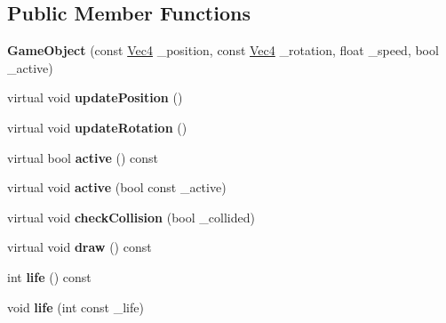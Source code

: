 \subsection*{Public Member Functions}
\begin{DoxyCompactItemize}
\item 
{\bfseries Game\+Object} (const \hyperlink{classVec4}{Vec4} \+\_\+position, const \hyperlink{classVec4}{Vec4} \+\_\+rotation, float \+\_\+speed, bool \+\_\+active)\hypertarget{classGameObject_a89fec6ab796fa6a89a7b7f575b3636b2}{}\label{classGameObject_a89fec6ab796fa6a89a7b7f575b3636b2}

\item 
virtual void {\bfseries update\+Position} ()\hypertarget{classGameObject_a889e4c64a347b028dfc08f2d07d74941}{}\label{classGameObject_a889e4c64a347b028dfc08f2d07d74941}

\item 
virtual void {\bfseries update\+Rotation} ()\hypertarget{classGameObject_a3d7da3a084131542410978e7fe4014be}{}\label{classGameObject_a3d7da3a084131542410978e7fe4014be}

\item 
virtual bool {\bfseries active} () const \hypertarget{classGameObject_a70fc35dbbeb50ccf6e8ff7d3bc7d1d02}{}\label{classGameObject_a70fc35dbbeb50ccf6e8ff7d3bc7d1d02}

\item 
virtual void {\bfseries active} (bool const \+\_\+active)\hypertarget{classGameObject_a0411665392a0af17c2da5364da9a4e2e}{}\label{classGameObject_a0411665392a0af17c2da5364da9a4e2e}

\item 
virtual void {\bfseries check\+Collision} (bool \+\_\+collided)\hypertarget{classGameObject_aed8abb63dd5ac35f712fa3635d37a6b1}{}\label{classGameObject_aed8abb63dd5ac35f712fa3635d37a6b1}

\item 
virtual void {\bfseries draw} () const \hypertarget{classGameObject_a288d4de0d98d836880f73d70dc98e14b}{}\label{classGameObject_a288d4de0d98d836880f73d70dc98e14b}

\item 
int {\bfseries life} () const \hypertarget{classGameObject_a50dbeccde2372724014b19bcf47d1d57}{}\label{classGameObject_a50dbeccde2372724014b19bcf47d1d57}

\item 
void {\bfseries life} (int const \+\_\+life)\hypertarget{classGameObject_a1a01cd7deaecc0f5db3d8aaf6c33cde8}{}\label{classGameObject_a1a01cd7deaecc0f5db3d8aaf6c33cde8}


\end{DoxyCompactItemize}
